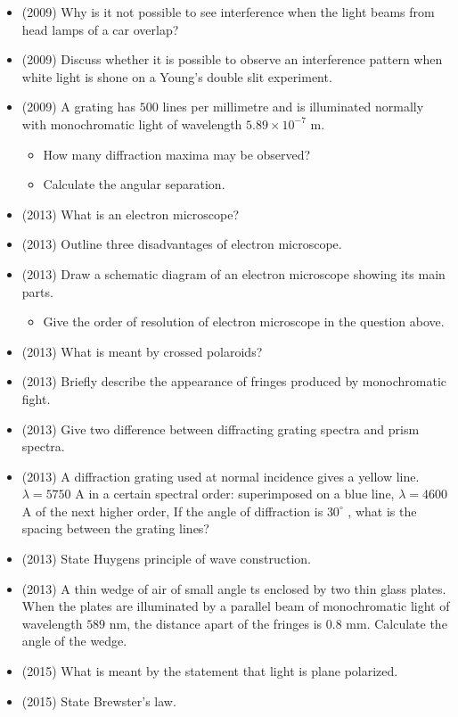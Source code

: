 \documentclass{article}
\begin{document}
\begin{itemize}
\item (2009)  Why is it not possible to see interference when the light beams from head lamps of a car overlap?
\item (2009)  Discuss whether it is possible to observe an interference pattern when white light is shone on a Young’s double slit experiment.
\item (2009)  A grating has $ 500$ lines per millimetre and is illuminated normally with monochromatic light of wavelength $ 5.89 \times 10^{-7}$ m.\begin{itemize}
\item How many diffraction maxima may be observed?
\item Calculate the angular separation.
\end{itemize}
\item (2013)  What is an electron microscope? 
\item (2013)  Outline three disadvantages of electron microscope.
\item (2013)  Draw a schematic diagram of an electron microscope showing its main parts.\begin{itemize}
\item Give the order of resolution of electron microscope in the question above.
\end{itemize}
\item (2013)  What is meant by crossed polaroids? 
\item (2013)  Briefly describe the appearance of fringes produced by monochromatic fight.
\item (2013)  Give two difference between diffracting grating spectra and prism spectra.
\item (2013)  A diffraction grating used at normal incidence gives a yellow line. $ \lambda =5750$ A in a certain spectral order: superimposed on a blue line, $ \lambda =4600$ A of the next higher order, If the angle of diffraction is $ 30^{\circ}$ , what is the spacing between the grating lines? 
\item (2013)  State Huygens principle of wave construction. 
\item (2013)  A thin wedge of air of small angle ts enclosed by two thin glass plates. When the plates are illuminated by a parallel beam of monochromatic light of wavelength $ 589$ nm, the distance apart of the fringes is $ 0.8$ mm. Calculate the angle of the wedge. 
\item (2015)  What is meant by the statement that light is plane polarized.
\item (2015)  State Brewster’s law.

\end{itemize}
\end{document}
